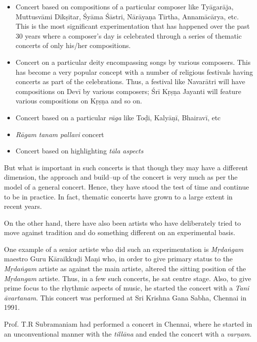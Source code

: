 \begin{itemize}
\item Concert based on compositions of a particular composer like Tyāgarāja, Muttusvāmi Dīkṣitar, Śyāma Śāstri, Nārāyaṇa Tīrtha, Annamācārya, etc. This is the most significant experimentation that has happened over the past 30 years where a composer’s day is celebrated through a series of thematic concerts of only his/her compositions.

 \item Concert on a particular deity encompassing songs by various composers. This has become a very popular concept with a number of religious festivals having concerts as part of the celebrations. Thus, a festival like Navarātri will have compositions on Devī by various composers; Śrī Kṛṣṇa Jayanti will feature various compositions on Kṛṣṇa and so on.

 \item Concert based on a particular \textit{rāga} like Toḍi, Kalyāṇī, Bhairavī, etc

 \item \textit{Rāgam tanam pallavi} concert

 \item Concert based on highlighting \textit{tāla aspects}

\end{itemize}

But what is important in such concerts is that though they may have a different dimension, the approach and build–up of the concert is very much as per the model of a general concert. Hence, they have stood the test of time and continue to be in practice. In fact, thematic concerts have grown to a large extent in recent years.

On the other hand, there have also been artists who have deliberately tried to move against tradition and do something different on an experimental basis.

One example of a senior artiste who did such an experimentation is \textit{Mṛdaṅgam} maestro Guru Kāraikkuḍi Maṇi who, in order to give primary status to the \textit{Mṛdaṅgam} artiste as against the main artiste, altered the sitting position of the \textit{Mṛdangam} artiste. Thus, in a few such concerts, he sat centre stage. Also, to give prime focus to the rhythmic aspects of music, he started the concert with a \textit{Tani āvartanam}. This concert was performed at Sri Krishna Gana Sabha, Chennai in 1991.

Prof. T.R Subramaniam had performed a concert in Chennai, where he started in an unconventional manner with the \textit{tillāna} and ended the concert with a \textit{varṇam}.

